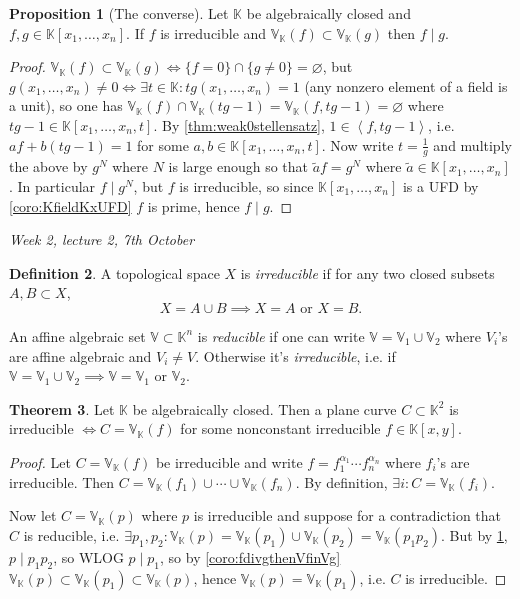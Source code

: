 \documentclass{article}
\newcommand{\K}{\mathbb{K}}
\newcommand{\V}{\mathbb{V}}
\newcommand{\la}{\left\langle}
\newcommand{\ra}{\right\rangle}
\theoremstyle{definition}
\newtheorem{defn}{Definition}[subsection]
\newtheorem{prop}[defn]{Proposition}
\newtheorem{thm}[defn]{Theorem}
\begin{document}
\begin{prop}[The converse]
\label{prop:VfinVgthenfdivg}
Let $\K$ be algebraically closed and $f,g\in\K[x_1,\ldots,x_n]$. If $f$ is irreducible and $\V_\K(f)\subset\V_\K(g)$ then $f\mid g$.
\end{prop}
\begin{proof}
$\V_\K(f)\subset\V_\K(g)\iff\{f=0\}\cap\{g\neq 0\}=\varnothing$, but $g(x_1,\ldots,x_n)\neq 0\iff\exists t\in\K:tg(x_1,\ldots,x_n)=1$ (any nonzero element of a field is a unit), so one has $\V_\K(f)\cap\V_\K(tg-1)=\V_\K(f,tg-1)=\varnothing$ where $tg-1\in\K[x_1,\ldots,x_n,t]$. By \ref{thm:weak0stellensatz}, $1\in\la f,tg-1\ra$, i.e. $af+b(tg-1)=1$ for some $a,b\in\K[x_1,\ldots,x_n,t]$. Now write $t=\frac1g$ and multiply the above by $g^N$ where $N$ is large enough so that $\widetilde a f=g^N$ where $\widetilde a\in\K[x_1,\ldots,x_n]$. In particular $f\mid g^N$, but $f$ is irreducible, so since $\K[x_1,\ldots,x_n]$ is a UFD by \ref{coro:KfieldKxUFD} $f$ is prime, hence $f\mid g$.
\end{proof}

\begin{flushright}
\textit{Week 2, lecture 2, 7th October}
\end{flushright}

\begin{defn}
\label{defn:irred}
A topological space $X$ is \textit{irreducible} if for any two closed subsets $A,B\subset X$,
\[
X=A\cup B\implies X=A\text{ or }X=B.
\]

An affine algebraic set $\V\subset\K^n$ is \textit{reducible} if one can write $\V=\V_1\cup\V_2$ where $V_i$'s are affine algebraic and $V_i\neq V$. Otherwise it's \textit{irreducible}, i.e. if $\V=\V_1\cup\V_2\implies \V=\V_1$ or $\V_2$.
\end{defn}

\begin{thm}
\label{thm:CisirrediffCisVKfwirredf}
Let $\K$ be algebraically closed. Then a plane curve $C\subset\K^2$ is irreducible $\iff C=\V_\K(f)$ for some nonconstant irreducible $f\in\K[x,y]$.
\end{thm}
\begin{proof}
Let $C=\V_\K(f)$ be irreducible and write $f=f_1^{\alpha_1}\cdots f_n^{\alpha_n}$ where $f_i$'s are irreducible. Then $C=\V_\K(f_1)\cup\cdots\cup\V_\K(f_n)$. By definition, $\exists i:C=\V_\K(f_i)$.

Now let $C=\V_\K(p)$ where $p$ is irreducible and suppose for a contradiction that $C$ is reducible, i.e. $\exists p_1,p_2:\V_\K(p)=\V_\K(p_1)\cup\V_\K(p_2)=\V_\K(p_1p_2)$. But by \ref{prop:VfinVgthenfdivg}, $p\mid p_1p_2$, so WLOG $p\mid p_1$, so by \ref{coro:fdivgthenVfinVg} $\V_\K(p)\subset\V_\K(p_1)\subset\V_\K(p)$, hence $\V_\K(p)=\V_\K(p_1)$, i.e. $C$ is irreducible.
\end{proof}
\end{document}
